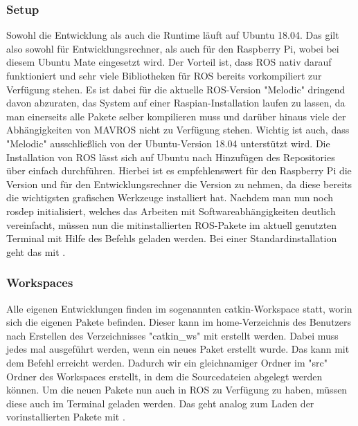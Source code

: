 \subsubsection{Setup} Sowohl die Entwicklung als auch die Runtime läuft auf Ubuntu 18.04. Das gilt also sowohl für Entwicklungsrechner, als auch für den Raspberry Pi, wobei bei diesem Ubuntu Mate eingesetzt wird. Der Vorteil ist, dass ROS nativ darauf funktioniert und sehr viele Bibliotheken für ROS bereits vorkompiliert zur Verfügung stehen. Es ist dabei für die aktuelle ROS-Version "Melodic" dringend davon abzuraten, das System auf einer Raspian-Installation laufen zu lassen, da man einerseits alle Pakete selber kompilieren muss und darüber hinaus viele der Abhängigkeiten von MAVROS nicht zu Verfügung stehen. Wichtig ist auch, dass "Melodic" ausschließlich von der Ubuntu-Version 18.04 unterstützt wird. Die Installation von ROS lässt sich auf Ubuntu nach Hinzufügen des Repositories über  einfach durchführen. Hierbei ist es empfehlenswert für den Raspberry Pi die  Version und für den Entwicklungsrechner die  Version zu nehmen, da diese bereits die wichtigsten grafischen Werkzeuge installiert hat. Nachdem man nun noch rosdep initialisiert, welches das Arbeiten mit Softwareabhängigkeiten deutlich vereinfacht, müssen nun die mitinstallierten ROS-Pakete im aktuell genutzten Terminal mit Hilfe des  Befehls geladen werden. Bei einer Standardinstallation geht das mit . \cite{martinez2013learning}
\subsubsection{Workspaces}
Alle eigenen Entwicklungen finden im sogenannten catkin-Workspace statt, worin sich die eigenen Pakete befinden. Dieser kann im home-Verzeichnis des Benutzers nach Erstellen des Verzeichnisses "catkin\_ws" mit  erstellt werden. Dabei muss  jedes mal ausgeführt werden, wenn ein neues Paket erstellt wurde. Das kann mit dem Befehl  erreicht werden. Dadurch wir ein gleichnamiger Ordner im "src" Ordner des Workspaces erstellt, in dem die Sourcedateien abgelegt werden können. Um die neuen Pakete nun auch in ROS zu Verfügung zu haben, müssen diese auch im Terminal geladen werden. Das geht analog zum Laden der vorinstallierten Pakete mit . 

